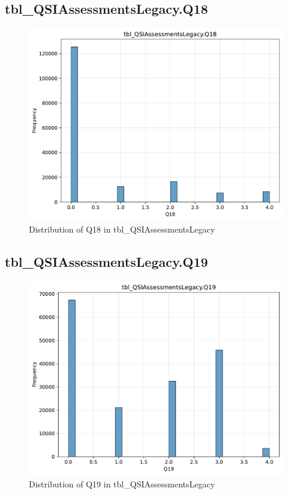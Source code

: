\subsection{tbl\_QSIAssessmentsLegacy.Q18}

\begin{figure}[htbp]
\centering
\includegraphics[width=\textwidth]{figures/dbo_tbl_QSIAssessmentsLegacy_Q18.pdf}
\caption{Distribution of Q18 in tbl\_QSIAssessmentsLegacy}
\end{figure}\newpage

\subsection{tbl\_QSIAssessmentsLegacy.Q19}

\begin{figure}[htbp]
\centering
\includegraphics[width=\textwidth]{figures/dbo_tbl_QSIAssessmentsLegacy_Q19.pdf}
\caption{Distribution of Q19 in tbl\_QSIAssessmentsLegacy}
\end{figure}\newpage

